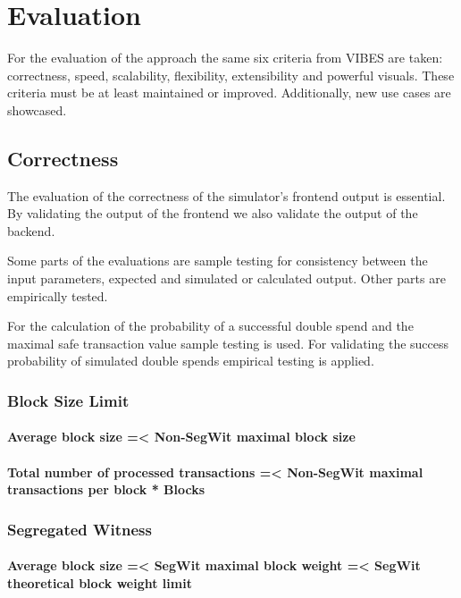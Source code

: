 \chapter{Evaluation}
\label{chapter:evaluation}

For the evaluation of the approach the same six criteria from VIBES are taken: correctness, speed, scalability, flexibility, extensibility and powerful visuals. These criteria must be at least maintained or improved. Additionally, new use cases are showcased.

\section{Correctness}
The evaluation of the correctness of the simulator's frontend output is essential. By validating the output of the frontend we also validate the output of the backend.

Some parts of the evaluations are sample testing for consistency between the input parameters, expected and simulated or calculated output. Other parts are empirically tested.

For the calculation of the probability of a successful double spend and the maximal safe transaction value sample testing is used. For validating the success probability of simulated double spends empirical testing is applied.

\subsection{Block Size Limit}

\subsubsection{Average block size =< Non-SegWit maximal block size}

\subsubsection{Total number of processed transactions =< Non-SegWit maximal transactions per block * Blocks}

\subsection{Segregated Witness}

\subsubsection{Average block size =< SegWit maximal block weight =< SegWit theoretical block weight limit}

